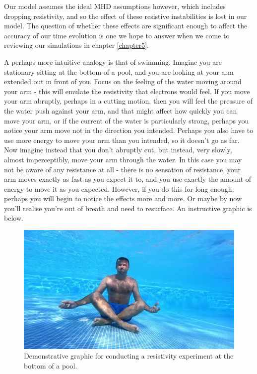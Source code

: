 Our model assumes the ideal MHD assumptions however, which includes dropping resistivity, and so the effect 
of these resistive instabilities is lost in our model. The question of whether these effects are significant 
enough to affect the accuracy of our time evolution is one we hope to answer when we come to reviewing our simulations in 
chapter \ref{chapter5}.

A perhaps more intuitive analogy is that of swimming. Imagine you are stationary sitting 
at the bottom of a pool, and you are looking at your arm extended out in front of you. 
Focus on the feeling of the water moving around your arm - this will emulate the resistivity 
that electrons would feel. If you move your arm abruptly, 
perhaps in a cutting motion, then you will feel the pressure of the water push against 
your arm, and that might affect how quickly you can move your arm, or if the current of the water is 
particularly strong, perhaps you notice your arm move not in the direction you intended. Perhaps 
you also have to use more energy to move your arm than you intended, so it doesn't go as far. 
Now imagine instead that you don't abruptly cut, but instead, very slowly, almost 
imperceptibly, move your arm through the water. In this case you may not be aware of any resistance at all 
- there is no sensation of resistance, your arm moves exactly as fast as you expect it to, and you use exactly 
the amount of energy to move it as you expected. However, if you do this for long enough, perhaps you 
will begin to notice the effects more and more. Or maybe by now you'll realise you're out of breath and need 
to resurface. An instructive graphic is below.

\begin{figure}[h!]
    \centering
    \includegraphics[scale=0.6]{imgs/c3/pool.png}
    \caption{Demonstrative graphic for conducting a resistivity experiment at the bottom of a pool.}
\end{figure}
\newpage

